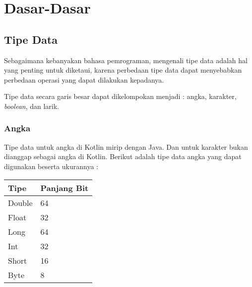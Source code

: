 \chapter{Dasar-Dasar}

\section{Tipe Data}

Sebagaimana kebanyakan bahasa pemrograman, mengenali tipe data adalah hal yang penting untuk diketaui, karena perbedaan tipe data dapat menyebabkan perbedaan operasi yang dapat dilakukan kepadanya.

Tipe data secara garis besar dapat dikelompokan menjadi : angka, karakter, \textit{boolean}, dan larik.

\subsection{Angka}

Tipe data untuk angka di Kotlin mirip dengan Java. Dan untuk karakter bukan dianggap sebagai angka di Kotlin. Berikut adalah tipe data angka yang dapat digunakan beserta ukurannya :

\begin{center}
\begin{tabular}{|l|l|}
	\hline
	\textbf{Tipe} & \textbf{Panjang Bit} \\
	\hline
	\hline
	Double & 64 \\
	\hline
	Float & 32 \\
	\hline
	Long & 64 \\
	\hline
	Int & 32 \\
	\hline
	Short & 16 \\
	\hline
	Byte & 8 \\
	\hline
\end{tabular}
\end{center}

